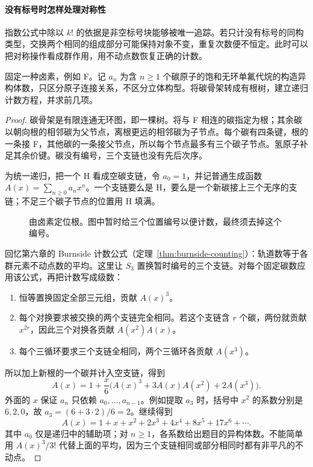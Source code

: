 \documentclass[lang=cn,a4paper,fontset=none,zihao=false,10pt,openany,twoside]{beautybook}
\numberwithin{algorithm}{chapter}
\begin{document}
\paragraph{没有标号时怎样处理对称性}
指数公式中除以 $k!$ 的依据是非空标号块能够被唯一追踪。若只计没有标号的同构类型，交换两个相同的组成部分可能保持对象不变，重复次数便不恒定。此时可以把对称操作看成群作用，用不动点数恢复正确的计数。
\begin{example}[单卤代烷与无序有根树]\label{ex:alkyl-rooted-trees}
固定一种卤素，例如 F。记 $a_n$ 为含 $n\ge1$ 个碳原子的饱和无环单氟代烷的构造异构体数，只区分原子连接关系，不区分立体构型。将碳骨架转成有根树，建立递归计数方程，并求前几项。
\end{example}
\begin{proof}
碳骨架是有限连通无环图，即一棵树。将与 F 相连的碳指定为根；其余碳以朝向根的相邻碳为父节点，离根更远的相邻碳为子节点。每个碳有四条键，根的一条接 F，其他碳的一条接父节点，所以每个节点最多有三个碳子节点。氢原子补足其余价键。碳没有编号，三个支链也没有先后次序。

为统一递归，把一个 H 看成空碳支链，令 $a_0=1$，并记普通生成函数 $A(x)=\sum_{n\ge0}a_nx^n$。一个支链要么是 H，要么是一个新碳接上三个无序的支链；不足三个碳子节点的位置用 H 填满。
\begin{figure}[H]
\centering
{}
\caption{由卤素定位根。图中暂时给三个位置编号以便计数，最终须去掉这个编号。}
\end{figure}

回忆第六章的 Burnside 计数公式（定理~\ref{thm:burnside-counting}）：轨道数等于各群元素不动点数的平均。这里让 $S_3$ 置换暂时编号的三个支链。对每个固定碳数应用该公式，再把计数写成级数：
\begin{enumerate}[(1)]
\item 恒等置换固定全部三元组，贡献 $A(x)^3$。
\item 每个对换要求被交换的两个支链完全相同。若这个支链含 $r$ 个碳，两份就贡献 $x^{2r}$，因此三个对换各贡献 $A(x^2)A(x)$。
\item 每个三循环要求三个支链全相同，两个三循环各贡献 $A(x^3)$。
\end{enumerate}
所以加上新根的一个碳并计入空支链，得到
\[
 A(x)=1+\frac{x}{6}\bigl(A(x)^3+3A(x)A(x^2)+2A(x^3)\bigr).
\]
外面的 $x$ 保证 $a_n$ 只依赖 $a_0,\ldots,a_{n-1}$。例如提取 $a_3$ 时，括号中 $x^2$ 的系数分别是 $6,2,0$，故 $a_3=(6+3\cdot2)/6=2$。继续得到
\[
 A(x)=1+x+x^2+2x^3+4x^4+8x^5+17x^6+\cdots.
\]
其中 $a_0$ 仅是递归中的辅助项；对 $n\ge1$，各系数给出题目的异构体数。不能简单用 $A(x)^3/3!$ 代替上面的平均，因为三个支链相同或部分相同时都有非平凡的不动点。
\end{proof}
\end{document}

